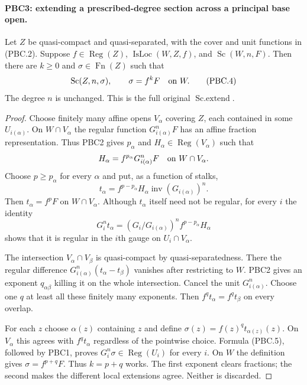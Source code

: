\documentclass[11pt,a4paper]{article}
\numberwithin{equation}{section}
\theoremstyle{remark}\newtheorem{remark}[theorem]{Remark}
\begin{document}
\paragraph{PBC3: extending a prescribed-degree section across a principal base open.}
\label{claim:PBC3}
Let $Z$ be quasi-compact and quasi-separated, with the cover and
unit functions in (PBC.2).  Suppose $f\in\operatorname{Reg}(Z)$,
$\operatorname{IsLoc}(W,Z,f)$, and
$\operatorname{Sc}(W,n,F)$.  Then there are $k\ge0$ and
$\sigma\in\operatorname{Fn}(Z)$ such that
\[
 \operatorname{Sc}(Z,n,\sigma),\qquad
 \sigma=f^kF\quad\hbox{on }W.
                                                        \tag{PBC.4}
\]
The degree $n$ is unchanged.  This is the full original
$\operatorname{Sc.extend}$.

\begin{proof}
Choose finitely many affine opens $V_\alpha$ covering $Z$, each
contained in some $U_{i(\alpha)}$.  On
$W\cap V_\alpha$ the regular function
$G_{i(\alpha)}^nF$ has an affine fraction representation.  Thus
PBC2 gives $p_\alpha$ and $H_\alpha\in\operatorname{Reg}(V_\alpha)$
such that
\[
 H_\alpha=f^{p_\alpha}G_{i(\alpha)}^nF
       \quad\hbox{on }W\cap V_\alpha.
\]
Choose $p\ge p_\alpha$ for every $\alpha$ and put, as a function of
stalks,
\[
 t_\alpha=f^{p-p_\alpha}H_\alpha
                    \operatorname{inv}(G_{i(\alpha)})^n.
\]
Then $t_\alpha=f^pF$ on $W\cap V_\alpha$.  Although $t_\alpha$
itself need not be regular, for every $i$ the identity
\[
 G_i^nt_\alpha
  =(G_i/G_{i(\alpha)})^n f^{p-p_\alpha}H_\alpha
                                                        \tag{PBC.5}
\]
shows that it is regular in the $i$th gauge on $U_i\cap V_\alpha$.

The intersection $V_\alpha\cap V_\beta$ is quasi-compact by
quasi-separatedness.  There the regular difference
$G_{i(\alpha)}^n(t_\alpha-t_\beta)$ vanishes after restricting to
$W$.  PBC2 gives an exponent $q_{\alpha\beta}$ killing it on the
whole intersection.  Cancel the unit $G_{i(\alpha)}^n$.
Choose one $q$ at least all these finitely many exponents.  Then
$f^qt_\alpha=f^qt_\beta$ on every overlap.

For each $z$ choose $\alpha(z)$ containing $z$ and define
$\sigma(z)=f(z)^qt_{\alpha(z)}(z)$.  On $V_\alpha$ this agrees
with $f^qt_\alpha$ regardless of the pointwise choice.  Formula
(PBC.5), followed by PBC1, proves
$G_i^n\sigma\in\operatorname{Reg}(U_i)$ for every $i$.
On $W$ the definition gives $\sigma=f^{p+q}F$.  Thus $k=p+q$
works.  The first exponent clears fractions; the second makes the
different local extensions agree.  Neither is discarded.
\end{proof}
\end{document}
